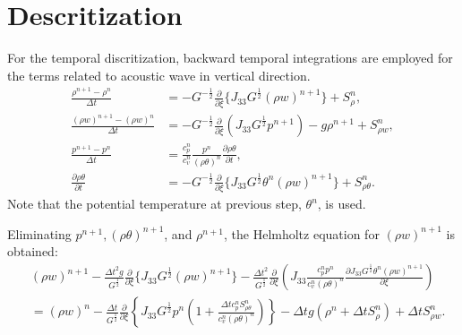 \section{Descritization}

For the temporal discritization, backward temporal integrations are employed for the terms related to acoustic wave in vertical direction.
\begin{align}
  \frac{\rho^{n+1}-\rho^n}{\Delta t}
  &= -G^{-\frac{1}{2}}\frac{\partial}{\partial \xi}\{J_{33}G^{\frac{1}{2}}(\rho w)^{n+1}\} + S_\rho^n, \\
  \frac{(\rho w)^{n+1}-(\rho w)^n}{\Delta t}
  &= -G^{-\frac{1}{2}}\frac{\partial}{\partial \xi}(J_{33}G^{\frac{1}{2}}p^{n+1}) -g\rho^{n+1} + S_{\rho w}^n, \\
  \frac{p^{n+1} - p^n}{\Delta t}
  &= \frac{c_p^n}{c_v^n} \frac{p^n}{(\rho\theta)^n}\frac{\partial \rho\theta}{\partial t}, \\
  \frac{\partial \rho\theta}{\partial t}
  &= -G^{-\frac{1}{2}}\frac{\partial}{\partial \xi}\{J_{33}G^{\frac{1}{2}}\theta^n (\rho w)^{n+1}\} + S_{\rho\theta}^n.
\end{align}
Note that the potential temperature at previous step, $\theta^n$, is used.

Eliminating $p^{n+1}, (\rho\theta)^{n+1}$, and $\rho^{n+1}$, the Helmholtz equation for $(\rho w)^{n+1}$ is obtained:
\begin{align}
  &
  (\rho w)^{n+1}
  - \frac{\Delta t^2 g}{G^{\frac{1}{2}}}\frac{\partial}{\partial \xi} \{J_{33}G^{\frac{1}{2}}(\rho w)^{n+1}\}
  - \frac{\Delta t^2}{G^{\frac{1}{2}}}\frac{\partial}{\partial \xi}\left(J_{33}\frac{c_p^n p^n}{c_v^n (\rho\theta)^n}\frac{\partial J_{33}G^{\frac{1}{2}}\theta^n (\rho w)^{n+1}}{\partial \xi}\right) \nonumber\\
  &= (\rho w)^n
  - \frac{\Delta t}{G^{\frac{1}{2}}}\frac{\partial}{\partial \xi}\left\{J_{33}G^{\frac{1}{2}}p^n\left(1+\frac{\Delta t c_p^n S_{\rho\theta}^n}{c_v^n (\rho\theta)^n}\right)\right\}
  - \Delta t g (\rho^n + \Delta t S_\rho^n)
  + \Delta t S_{\rho w}^n.
\end{align}

